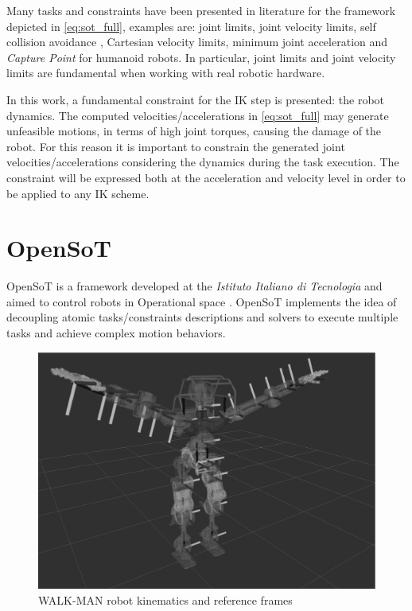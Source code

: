 Many tasks and constraints have been presented in literature for the framework depicted in \eqref{eq:sot_full}, examples are: joint limits, joint velocity limits, self collision avoidance \cite{kanehiro2008local}, Cartesian velocity limits, minimum joint acceleration \cite{DBLP:conf/icra/FlaccoLK12} and \emph{Capture Point} \cite{ ramos-humanoid-14} for humanoid robots. In particular, joint limits and joint velocity limits are fundamental when working with real robotic hardware.  

In this work, a fundamental constraint for the IK step is presented: the robot dynamics. The computed velocities/accelerations in \eqref{eq:sot_full} may generate unfeasible motions, in terms of high joint torques, causing the damage of the robot. For this reason it is important to constrain the generated joint velocities/accelerations considering the dynamics during the task execution. The constraint will be expressed both at the acceleration and velocity level in order to be applied to any IK scheme.  

\section{OpenSoT}
\label{sec:opensot}
OpenSoT is a framework developed at the \emph{Istituto Italiano di Tecnologia} and aimed to control robots in Operational space \cite{AlessioEnrico2015}. OpenSoT implements the idea of decoupling atomic tasks/constraints descriptions and solvers to execute multiple tasks and achieve complex motion behaviors. 

\begin{figure}[htb] 
\centering 
\includegraphics[width=\textwidth]{images/walkman_kinematics.eps} 
\caption{WALK-MAN robot kinematics and reference frames} 
\label{walkman_kinematics}
\end{figure}

